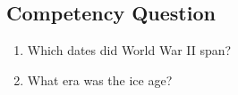 \subsection{Competency Question}
\label{cqs:Temporal}
\begin{enumerate}[CQ1.]
\item Which dates did World War II span?
\item What era was the ice age?
\end{enumerate}

\newpage
